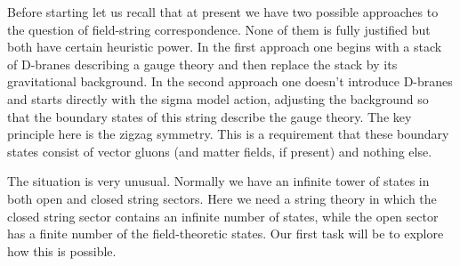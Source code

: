\documentclass[a4paper,12pt]{article}
\begin{document}
Before starting let us recall that at present we have two possible
approaches to the question of field-string correspondence. None of them is
fully justified but both have certain heuristic power. In the first approach
one begins with a stack of D-branes describing a gauge theory and then
replace the stack by its gravitational background. In the second approach
one doesn't introduce D-branes and starts directly with the sigma model
action, adjusting the background so that the boundary states of this string
describe the gauge theory. The key principle here is the zigzag symmetry.
This is a requirement that these boundary states consist of vector gluons
(and matter fields, if present) and nothing else.

The situation is very unusual. Normally we have an infinite tower of states
in both open and closed string sectors. Here we need a string theory in
which the closed string sector contains an infinite number of states, while
the open sector has a finite number of the field-theoretic states. Our first
task will be to explore how this is possible.
\end{document}
